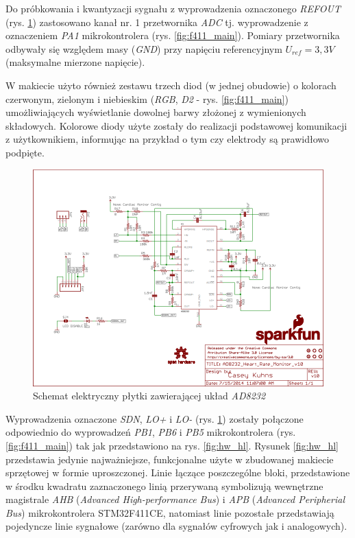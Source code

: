 Do próbkowania i kwantyzacji sygnału z wyprowadzenia oznaczonego \textit{REFOUT} (rys. \ref{fig:ad8232_sch})
zastosowano kanał nr. 1 przetwornika \textit{ADC} tj. wyprowadzenie z oznaczeniem \textit{PA1} mikrokontrolera 
(rys. \ref{fig:f411_main}). Pomiary przetwornika odbywały się względem masy (\textit{GND}) przy napięciu referencyjnym
$U_{ref} = 3,3V$ (maksymalne mierzone napięcie).

W makiecie użyto również zestawu trzech diod (w jednej obudowie) o kolorach czerwonym, zielonym i niebieskim 
(\textit{RGB}, \textit{D2} - rys. \ref{fig:f411_main}) umożliwiających wyświetlanie dowolnej barwy złożonej 
z wymienionych składowych. Kolorowe diody użyte zostały do realizacji podstawowej komunikacji z użytkownikiem,
informując na przykład o tym czy elektrody są prawidłowo podpięte.

\begin{figure}[h!]
    \centering 
    \includegraphics[scale=0.65]{pl/media/ad8232_sch.png}
    \caption{Schemat elektryczny płytki \cite{AD8232BS} zawierającej układ \textit{AD8232}}
    \label{fig:ad8232_sch}
\end{figure}

Wyprowadzenia oznaczone \textit{SDN}, \textit{LO+} i \textit{LO-} (rys. \ref{fig:ad8232_sch}) zostały połączone odpowiednio 
do wyprowadzeń \textit{PB1}, \textit{PB6} i \textit{PB5} mikrokontrolera (rys. \ref{fig:f411_main}) tak jak przedstawiono na
rys. \ref{fig:hw_hl}. Rysunek \ref{fig:hw_hl} przedstawia jedynie najważniejsze, funkcjonalne użyte w zbudowanej 
makiecie sprzętowej w formie uproszczonej. Linie łączące poszczególne bloki, przedstawione w środku kwadratu zaznaczonego 
linią przerywaną symbolizują wewnętrzne magistrale \textit{AHB} (\textit{Advanced High-performance Bus}) i 
\textit{APB} (\textit{Advanced Peripherial Bus}) mikrokontrolera STM32F411CE, natomiast linie pozostałe przedstawiają pojedyncze
linie sygnałowe (zarówno dla sygnałów cyfrowych jak i analogowych).

